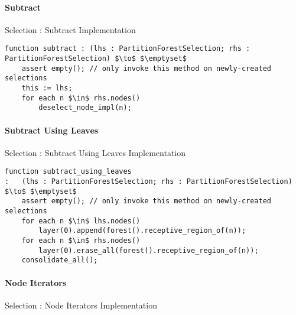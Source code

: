 \paragraph{Subtract}

\begin{stulisting}[H]
\caption{Selection : Subtract Implementation}
\begin{lstlisting}[style=Default]
function subtract : (lhs : PartitionForestSelection; rhs : PartitionForestSelection) $\to$ $\emptyset$
	assert empty();	// only invoke this method on newly-created selections
	this := lhs;
	for each n $\in$ rhs.nodes()
		deselect_node_impl(n);
\end{lstlisting}
\end{stulisting}

\paragraph{Subtract Using Leaves}

\begin{stulisting}[H]
\caption{Selection : Subtract Using Leaves Implementation}
\begin{lstlisting}[style=Default]
function subtract_using_leaves
:	(lhs : PartitionForestSelection; rhs : PartitionForestSelection) $\to$ $\emptyset$
	assert empty();	// only invoke this method on newly-created selections
	for each n $\in$ lhs.nodes()
		layer(0).append(forest().receptive_region_of(n));
	for each n $\in$ rhs.nodes()
		layer(0).erase_all(forest().receptive_region_of(n));
	consolidate_all();
\end{lstlisting}
\end{stulisting}

\paragraph{Node Iterators}

\begin{stulisting}[H]
\caption{Selection : Node Iterators Implementation}

\end{stulisting}

\newpage

